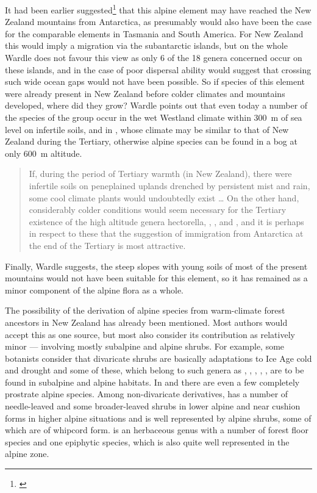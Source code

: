 It had been earlier suggested\footnote{\cite{fleming1963age}} that this alpine element may have reached the New Zealand mountains from Antarctica, as presumably would also have been the case for the comparable elements in Tasmania and South America.
For New Zealand this would imply a migration via the subantarctic islands, but on the whole Wardle does not favour this view as only 6 of the 18 genera concerned occur on these islands, and in the case of  poor dispersal ability would suggest that crossing such wide ocean gaps would not have been possible.
So if species of this element were already present in New Zealand before colder climates and mountains developed, where did they grow? Wardle points out that even today a number of the species of the group occur in the wet Westland climate within \SI{300}{\metre} of sea level on infertile soils, and in , whose climate may be similar to that of New Zealand during the Tertiary, otherwise alpine species can be found in a bog at only \SI{600}{\metre} altitude.

\begin{quote}
	If, during the period of Tertiary warmth (in New Zealand), there were infertile soils on peneplained uplands drenched by persistent mist and rain, some cool climate plants would undoubtedly exist … On the other hand, considerably colder conditions would seem necessary for the Tertiary existence of the high altitude genera hectorella, , ,  and , and it is perhaps in respect to these that the suggestion of immigration from Antarctica at the end of the Tertiary is most attractive.
\end{quote}

Finally, Wardle suggests, the steep slopes with young soils of most of the present mountains would not have been suitable for this element, so it has remained as a minor component of the alpine flora as a whole.

The possibility of the derivation of alpine species from warm-climate forest ancestors in New Zealand has already been mentioned.
Most authors would accept this as one source, but most also consider its contribution as relatively minor --- involving mostly subalpine and alpine shrubs.
For example, some botanists consider that divaricate shrubs are basically adaptations to Ice Age cold and drought and some of these, which belong to such genera as , , , , , are to be found in subalpine and alpine habitats.
In  and  there are even a few completely prostrate alpine species.
Among non-divaricate derivatives,  has a number of needle-leaved and some broader-leaved shrubs in lower alpine and near cushion forms in higher alpine situations and  is well represented by alpine shrubs, some of which are of whipcord form.  is an herbaceous genus with a number of forest floor species and one epiphytic species, which is also quite well represented in the alpine zone.

